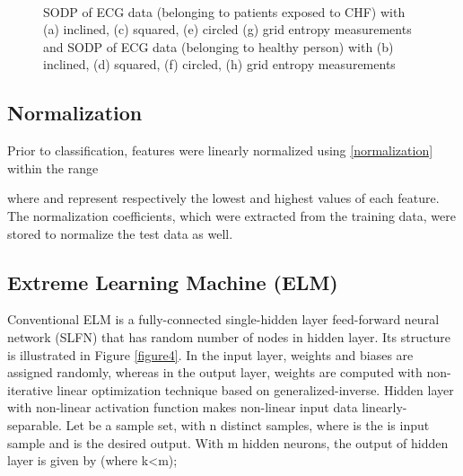 \documentclass[twocolumn]{svjour3}
\begin{document}
\begin{figure*}\centering
  \\
\caption{SODP of ECG data (belonging to patients exposed to CHF) with (a) inclined, (c) squared, (e) circled (g) grid entropy measurements and SODP of  ECG data (belonging to healthy person) with (b) inclined, (d) squared, (f) circled, (h) grid entropy measurements}\label{figure3}\end{figure*}

\subsection{Normalization}
Prior to classification, features were linearly normalized using \ref{normalization} within the range 

where  and  represent respectively the lowest and highest values of each feature. The normalization coefficients, which were extracted from the training data, were stored to normalize the test data as well.


\subsection{Extreme Learning Machine (ELM)}
Conventional ELM \cite{ref22} is a fully-connected single-hidden layer feed-forward neural network (SLFN) that has random number of nodes in hidden layer. Its structure is illustrated in Figure \ref{figure4}. In the input layer, weights and biases are assigned randomly, whereas in the output layer, weights are computed with non-iterative linear optimization technique based on generalized-inverse. Hidden layer with non-linear activation function makes non-linear input data linearly-separable. Let  be a sample set, with n distinct samples, where   is the  is input sample and  is the  desired output. With m hidden neurons, the output of  hidden layer is given by (where k<m);
\end{document}
